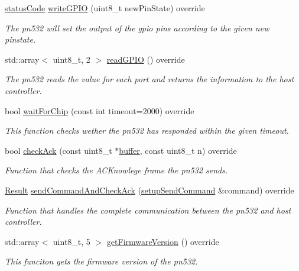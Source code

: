 \begin{DoxyCompactItemize}
\hyperlink{declarations_8h_ae1d20c5a38cae82ccaa6a77be3fd264b}{status\+Code} \hyperlink{classnfc_1_1PN532__chip_ad33f6bf96640bf7b10407e735ca57e2a}{write\+G\+P\+IO} (uint8\+\_\+t new\+Pin\+State) override
\begin{DoxyCompactList}\small\item\em The pn532 will set the output of the gpio pins according to the given new pinstate. \end{DoxyCompactList}\item 
std\+::array$<$ uint8\+\_\+t, 2 $>$ \hyperlink{classnfc_1_1PN532__chip_a1c7e2ace0798d1e6b11bbab4a5e632c5}{read\+G\+P\+IO} () override
\begin{DoxyCompactList}\small\item\em The pn532 reads the value for each port and returns the information to the host controller. \end{DoxyCompactList}\item 
bool \hyperlink{classnfc_1_1PN532__chip_a10aa275adf2ddbcb6db5afa5666a9594}{wait\+For\+Chip} (const int timeout=2000) override
\begin{DoxyCompactList}\small\item\em This function checks wether the pn532 has responded within the given timeout. \end{DoxyCompactList}\item 
bool \hyperlink{classnfc_1_1PN532__chip_a631fa2690b45119c7bbb99e07f41b464}{check\+Ack} (const uint8\+\_\+t $\ast$\hyperlink{classbuffer}{buffer}, const uint8\+\_\+t n) override
\begin{DoxyCompactList}\small\item\em Function that checks the A\+C\+Knowlege frame the pn532 sends. \end{DoxyCompactList}\item 
\hyperlink{structnfc_1_1Result}{Result} \hyperlink{classnfc_1_1PN532__chip_a3184528f3e8e793905d1638067cfe9e1}{send\+Command\+And\+Check\+Ack} (\hyperlink{classsetupSendCommand}{setup\+Send\+Command} \&command) override
\begin{DoxyCompactList}\small\item\em Function that handles the complete communication between the pn532 and host controller. \end{DoxyCompactList}\item 
std\+::array$<$ uint8\+\_\+t, 5 $>$ \hyperlink{classnfc_1_1PN532__chip_a00764b6b9472c89430bb1503ec1bf08b}{get\+Firmware\+Version} () override
\begin{DoxyCompactList}\small\item\em This funciton gets the firmware version of the pn532. \end{DoxyCompactList}\item 

\end{DoxyCompactItemize}
